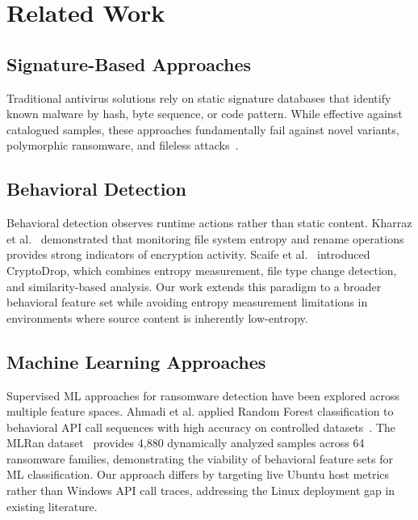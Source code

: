\documentclass[conference]{IEEEtran}
\begin{document}

\section{Related Work}

\subsection{Signature-Based Approaches}

Traditional antivirus solutions rely on static signature
databases that identify known malware by hash, byte sequence,
or code pattern. While effective against catalogued samples,
these approaches fundamentally fail against novel variants,
polymorphic ransomware, and fileless attacks~\cite{sgandurra2016}.

\subsection{Behavioral Detection}

Behavioral detection observes runtime actions rather than
static content. Kharraz et al.~\cite{kharraz2016} demonstrated
that monitoring file system entropy and rename operations
provides strong indicators of encryption activity.
Scaife et al.~\cite{scaife2016} introduced CryptoDrop, which
combines entropy measurement, file type change detection,
and similarity-based analysis. Our work extends this paradigm
to a broader behavioral feature set while avoiding entropy
measurement limitations in environments where source content
is inherently low-entropy.

\subsection{Machine Learning Approaches}

Supervised ML approaches for ransomware detection have been
explored across multiple feature spaces. Ahmadi et al.
applied Random Forest classification to behavioral API call
sequences with high accuracy on controlled
datasets~\cite{ahmadi2016}. The MLRan dataset~\cite{mlran2024}
provides 4,880 dynamically analyzed samples across 64
ransomware families, demonstrating the viability of behavioral
feature sets for ML classification. Our approach differs by
targeting live Ubuntu host metrics rather than Windows API
call traces, addressing the Linux deployment gap in
existing literature.
\end{document}
